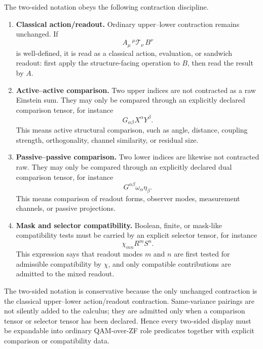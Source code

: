 \begin{definition}\label{def:two-sided-admissible-contractions}
The two-sided notation obeys the following contraction discipline.
\begin{enumerate}[leftmargin=2em]
 \item \textbf{Classical action/readout.} Ordinary upper--lower contraction remains unchanged. If
 \[
 A_\mu\,{}^\mu\mathcal{T}_\nu\,B^\nu
 \]
 is well-defined, it is read as a classical action, evaluation, or sandwich readout: first apply the structure-facing operation to \(B\), then read the result by \(A\).
 \item \textbf{Active--active comparison.} Two upper indices are not contracted as a raw Einstein sum. They may only be compared through an explicitly declared comparison tensor, for instance
 \[
 G_{\alpha\beta}X^\alpha Y^\beta .
 \]
 This means active structural comparison, such as angle, distance, coupling strength, orthogonality, channel similarity, or residual size.
 \item \textbf{Passive--passive comparison.} Two lower indices are likewise not contracted raw. They may only be compared through an explicitly declared dual comparison tensor, for instance
 \[
 G^{\alpha\beta}\omega_\alpha\eta_\beta .
 \]
 This means comparison of readout forms, observer modes, measurement channels, or passive projections.
 \item \textbf{Mask and selector compatibility.} Boolean, finite, or mask-like compatibility tests must be carried by an explicit selector tensor, for instance
 \[
 \chi_{mn}R^mS^n .
 \]
 This expression says that readout modes \(m\) and \(n\) are first tested for admissible compatibility by \(\chi\), and only compatible contributions are admitted to the mixed readout.
\end{enumerate}
\end{definition}

\begin{remark}\label{rem:two-sided-conservative-reading-rule}
The two-sided notation is conservative because the only unchanged contraction is the classical upper--lower action/readout contraction. Same-variance pairings are not silently added to the calculus; they are admitted only when a comparison tensor or selector tensor has been declared. Hence every two-sided display must be expandable into ordinary QAM-over-ZF role predicates together with explicit comparison or compatibility data.
\end{remark}

